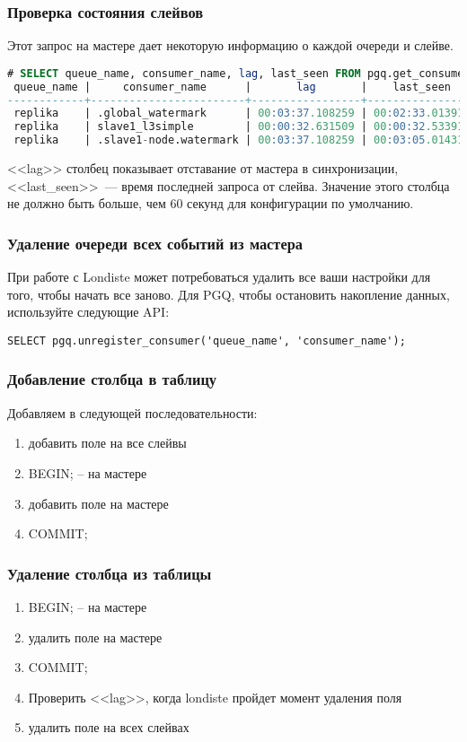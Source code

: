 \subsubsection{Проверка состояния слейвов}
Этот запрос на мастере дает некоторую информацию о каждой очереди и слейве.
\begin{lstlisting}[language=SQL,label=lst:londiste21,caption=Проверка состояния слейвов]
# SELECT queue_name, consumer_name, lag, last_seen FROM pgq.get_consumer_info();
 queue_name |     consumer_name      |       lag       |    last_seen
------------+------------------------+-----------------+-----------------
 replika    | .global_watermark      | 00:03:37.108259 | 00:02:33.013915
 replika    | slave1_l3simple        | 00:00:32.631509 | 00:00:32.533911
 replika    | .slave1-node.watermark | 00:03:37.108259 | 00:03:05.01431
\end{lstlisting}

<<lag>> столбец показывает отставание от мастера в синхронизации,
<<last\_seen>>~--- время последней запроса от слейва. Значение этого столбца не должно быть больше, чем 60 секунд для конфигурации по умолчанию.

\subsubsection{Удаление очереди всех событий из мастера}
При работе с Londiste может потребоваться удалить все ваши настройки для того, чтобы начать все заново.
Для PGQ, чтобы остановить накопление данных, используйте следующие API:

\begin{lstlisting}[label=lst:londiste22,caption=Удаление очереди всех событий из мастера]
SELECT pgq.unregister_consumer('queue_name', 'consumer_name');
\end{lstlisting}

\subsubsection{Добавление столбца в таблицу}
Добавляем в следующей последовательности:
\begin{enumerate}
 \item добавить поле на все слейвы
 \item BEGIN; -- на мастере
 \item добавить поле на мастере
 \item COMMIT;
\end{enumerate}

\subsubsection{Удаление столбца из таблицы}
\begin{enumerate}
 \item BEGIN; -- на мастере
 \item удалить поле на мастере
 \item COMMIT;
 \item Проверить <<lag>>, когда londiste пройдет момент удаления поля
 \item удалить поле на всех слейвах
\end{enumerate}

